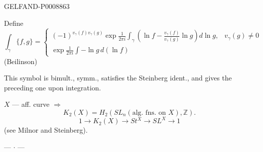 \begin{GelfandAdjacentEvidence}{GELFAND-P000886}{3}


Define
\begin{equation*}
\int_\gamma\{f,g\}=
\begin{cases}
(-1)^{v_\gamma(f)v_\gamma(g)}\exp\frac{1}{2\pi i}\int_\gamma
\left(\ln f-\frac{v_\gamma(f)}{v_\gamma(g)}\ln g\right)d\ln g,&v_\gamma(g)\ne0\\[3pt]
\exp\frac{1}{2\pi i}\int-\ln g\,d(\ln f)
\end{cases}
\tag{16}
\end{equation*}
(Beilinson)

This symbol is bimult., symm., satisfies the Steinberg ident., and gives the preceding one upon integration.
\end{GelfandAdjacentEvidence}


$X$ --- aff. curve $\Rightarrow$
\begin{equation*}
K_2(X)=H_2(SL_n(\text{alg. fns. on }X),\mathbb Z).
\tag{17}
\end{equation*}
\begin{equation*}
1\to K_2(X)\to St^X\to SL^X\to1
\tag{18}
\end{equation*}
(see Milnor and Steinberg).

\begin{center}
--- $\cdot$ ---
\end{center}


